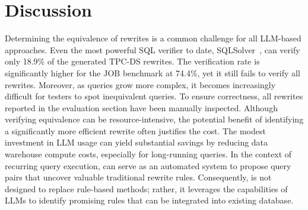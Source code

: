 \section{Discussion}
\label{gen:sec:discussion}

Determining the equivalence of rewrites is a common challenge for all LLM-based approaches. Even the most powerful SQL verifier to date, SQLSolver~\cite{ding2023proving}, can verify only 18.9\% of the generated TPC-DS rewrites. The verification rate is significantly higher for the JOB benchmark at 74.4\%, yet it still fails to verify all rewrites. Moreover, as queries grow more complex, it becomes increasingly difficult for testers to spot inequivalent queries. To ensure correctness, all rewrites reported in the evaluation section have been manually inspected.
Although verifying equivalence can be resource-intensive, the potential benefit of identifying a significantly more efficient rewrite often justifies the cost. 
The modest investment in LLM usage can yield substantial savings by reducing data warehouse compute costs, especially for long-running queries.
In the context of recurring query execution, \genrewrite can serve as an automated system to propose query pairs that uncover valuable traditional rewrite rules. Consequently, \genrewrite is not designed to replace rule-based methods; rather, it leverages the capabilities of LLMs to identify promising rules that can be integrated into existing database. 



